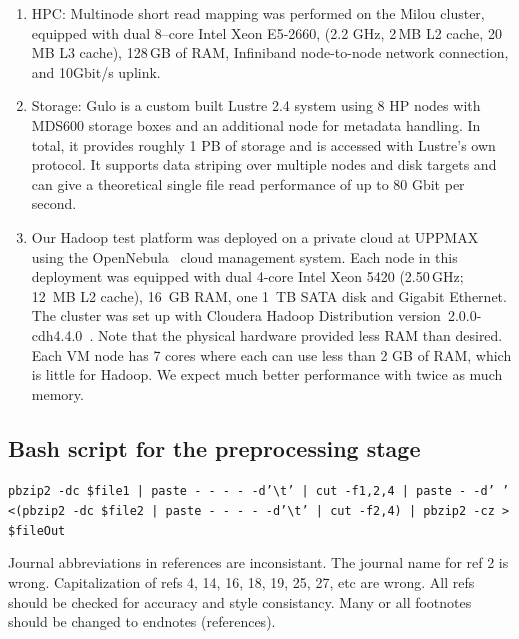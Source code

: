 \documentclass[11pt, oneside]{article}   	%
\newcommand{\COMMENT}[1]{{\color{red} #1 }}
\begin{document}
\begin{enumerate}

\item 
HPC:
Multinode short read mapping was performed on the Milou cluster\cite{milouCluster}, equipped with dual 8--core Intel Xeon E5-2660, (2.2 GHz, 2\,MB L2 cache, 20\,MB L3 cache), 128\,GB of RAM, Infiniband node-to-node network connection, and 10Gbit/s uplink.

\item Storage: 
Gulo\cite{gulo} is a custom built Lustre 2.4 system using 8 HP nodes with MDS600 storage boxes and an additional node for metadata handling. In total, it provides roughly 1 PB of storage and is accessed with Lustre's own protocol. It supports data striping over multiple nodes and disk targets and can give a theoretical single file read performance of up to 80 Gbit per second.

\item Our Hadoop test platform was deployed on a private cloud at UPPMAX using the OpenNebula~\cite{opennebula} cloud management system. Each node in this deployment was equipped with dual 4-core Intel Xeon 5420 (2.50\,GHz; 12~MB L2 cache), 16~GB RAM, one 1~TB SATA disk and Gigabit Ethernet. The cluster was set up with Cloudera Hadoop Distribution version~2.0.0-cdh4.4.0~\cite{cloudera}.
Note that the physical hardware provided less RAM than desired. Each VM node has 7 cores where each can use less than 2 GB of RAM, which is little for Hadoop. We expect much better performance with twice as much memory.
\end{enumerate}


\subsection{Bash script for the preprocessing stage}

\texttt {pbzip2 -dc  \${file1} | paste - - - - -d'\textbackslash t' | cut -f1,2,4 | paste - -d' ' <(pbzip2 -dc  \${file2} | paste - - - - -d'\textbackslash t' | cut -f2,4) | pbzip2 -cz > \${fileOut}}


\COMMENT{Journal abbreviations in references are inconsistant. The journal name for ref 2 is wrong. Capitalization of refs 4, 14, 16, 18, 19, 25, 27, etc are wrong. All refs should be checked for accuracy and style consistancy. Many or all footnotes should be changed to endnotes (references).}




\end{document}
